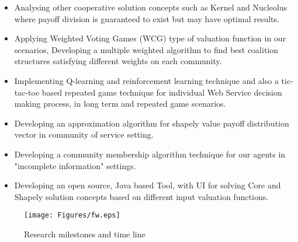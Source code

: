 \begin{itemize}
\item Analysing other cooperative solution concepts such as Kernel and Nucleolus where payoff division is guaranteed to exist but may have optimal results.
\item Applying Weighted Voting Games (WCG) type of valuation function in our scenarios, Developing a multiple weighted algorithm to find best coalition structures satisfying different weights on each community.
\item Implementing Q-learning and reinforcement learning technique and also a tic-tac-toe based repeated game technique for individual Web Service decision making process, in long term and repeated game scenarios.
\item Developing an approximation algorithm for shapely value payoff distribution vector in community of service setting.    
\item Developing a community membership algorithm technique for our agents in "incomplete information" settings.
\item Developing an open source, Java based Tool, with UI for solving Core and Shapely solution concepts based on different input valuation functions.
\end{itemize}


    \begin{figure}
                \begin{center}
                \texttt{[image: Figures/fw.eps]}\label{Timetable}
                \caption{Research milestones and time line}
                \end{center}
    \end{figure}   